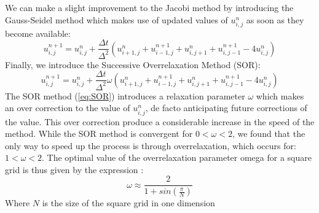 \documentclass[a4paper]{article}
\begin{document}
We can make a slight improvement to the Jacobi method by introducing the 
Gauss-Seidel method which makes use of updated values of $u^n_{i,j}$ as soon as 
they become available:
\begin{equation}
u^{n+1}_{i,j}=u^n_{i,j}+\frac{\Delta 
t}{\Delta^2}(u^n_{i+1,j}+u^{n+1}_{i-1,j}+u^n_{i,j+1}+u^{n+1}_{i,j-1}-4u^n_{i,j})
\label{eq:Gauss}
\end{equation}
Finally, we introduce the Successive Overrelaxation Method (SOR): 
\begin{equation}
u^{n+1}_{i,j}=u^n_{i,j}+\frac{\Delta t}{\Delta^2} \omega 
(u^n_{i+1,j}+u^{n+1}_{i-1,j}+u^n_{i,j+1}+u^{n+1}_{i,j-1}-4u^n_{i,j})
\label{eq:SOR}
\end{equation}
The SOR method (\ref{eq:SOR}) introduces a relaxation parameter $\omega$ which 
makes an over correction to the value of $u^n_{i,j}$, de facto anticipating 
future corrections of the value. This over correction produce a considerable 
increase in the speed of the method. While the SOR method is convergent for 
$0<\omega<2$, we found that the only way to speed up the process is through 
overrelaxation, which occurs for: $1<\omega<2$. The optimal value of the 
overrelaxation parameter omega for a square grid is thus given by the 
expression\cite{omega} \cite{matrixcomp}:
\begin{equation}
\omega \approx \frac{2}{1+sin(\frac{\pi}{N})}
\label{eq:Omega}
\end{equation}
Where $N$ is the size of the square grid in one dimension
\end{document}
